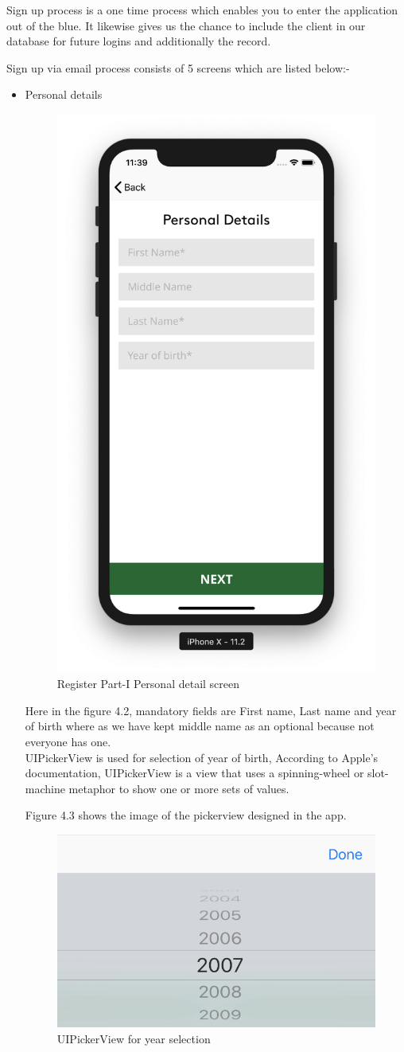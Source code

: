 Sign up process is a one time process which enables you to enter the application out of the blue. It likewise gives us the chance to include the client in our database for future logins and additionally the record.

Sign up via email process consists of 5 screens which are listed below:-

\newpage

\begin{itemize}

    \item Personal details
    
    \begin{figure}[H]
            \centering
            \includegraphics[width=0.4\linewidth]{figures/ch2/register_personal.png}
            \caption{\label{fig:wireframe_3} Register Part-I Personal detail screen}
    \end{figure}
    
    Here in the figure 4.2, mandatory fields are First name, Last name and year of birth where as we have kept middle name as an optional because not everyone has one. \\
    
    UIPickerView is used for selection of year of birth, According to Apple's documentation, UIPickerView is a view that uses a spinning-wheel or slot-machine metaphor to show one or more sets of values.
    
    Figure 4.3 shows the image of the pickerview designed in the app.
    
    \begin{figure}[H]
            \centering
            \includegraphics[width=0.4\linewidth]{figures/ch4/pickerview.png}
            \caption{\label{fig:wireframe_3} UIPickerView for year selection}
    \end{figure}
    

\end{itemize}
